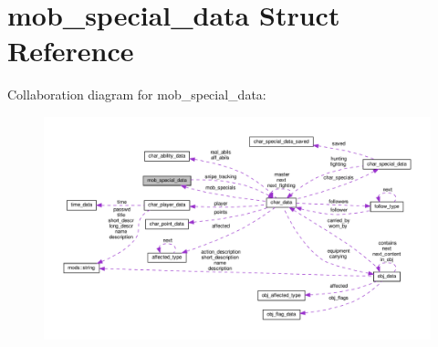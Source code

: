 \hypertarget{structmob__special__data}{}\section{mob\+\_\+special\+\_\+data Struct Reference}
\label{structmob__special__data}


Collaboration diagram for mob\+\_\+special\+\_\+data\+:
\nopagebreak
\begin{figure}[H]
\begin{center}
\leavevmode
\includegraphics[width=350pt]{structmob__special__data__coll__graph}
\end{center}
\end{figure}
